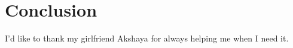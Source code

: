 \documentclass[sigconf,10pt]{acmart}
\begin{document}
\section{Conclusion}

\begin{acks}
I'd like to thank my girlfriend Akshaya for always helping me when I need it.
\end{acks}



\end{document}
